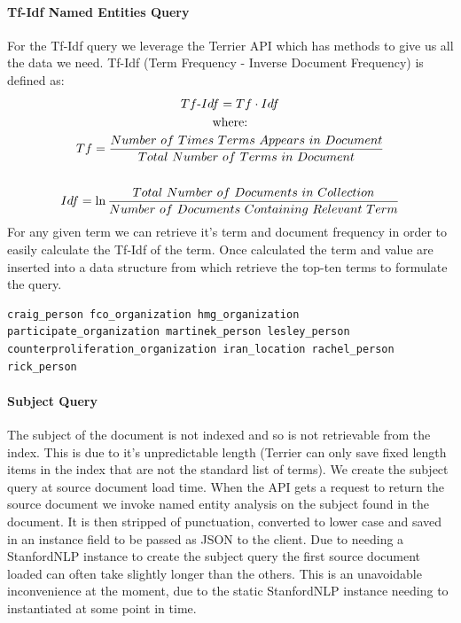 \documentclass{l4proj}
\newenvironment{codelisting}{\captionsetup{type=listing}}{}
\begin{document}
\paragraph{Tf-Idf Named Entities Query}
For the Tf-Idf query we leverage the Terrier API which has methods to give us all the data we need.
Tf-Idf (Term Frequency - Inverse Document Frequency) is defined as:
\begin{gather*}
Tf\textnormal{-}Idf = Tf \cdot Idf \\
\textnormal{where:} \\ 
Tf = \frac{Number\ of\ Times\ Terms\ Appears\ in\ Document}{Total\ Number\ of\ Terms\ in\ Document} \\ \\
Idf = \ln{\frac{Total\ Number\ of\ Documents\ in\ Collection}{Number\ of\ Documents\ Containing\ Relevant\ Term}}
\end{gather*}
For any given term we can retrieve it's term and document frequency in order to easily calculate the Tf-Idf of the term. Once calculated the term and value are inserted into a data structure from which retrieve the top-ten terms to formulate the query.\\
\begin{codelisting}
\begin{verbatim}
craig_person fco_organization hmg_organization participate_organization martinek_person lesley_person counterproliferation_organization iran_location rachel_person rick_person
\end{verbatim}
\label{code:tf_idf_query}
\end{codelisting}

\paragraph{Subject Query}
The subject of the document is not indexed and so is not retrievable from the index. This is due to it's unpredictable length (Terrier can only save fixed length items in the index that are not the standard list of terms). We create the subject query at source document load time. When the API gets a request to return the source document we invoke named entity analysis on the subject found in the document. It is then stripped of punctuation, converted to lower case and saved in an instance field to be passed as JSON to the client. Due to needing a StanfordNLP instance to create the subject query the first source document loaded can often take slightly longer than the others. This is an unavoidable inconvenience at the moment, due to the static StanfordNLP instance needing to instantiated at some point in time.\\
\end{document}

